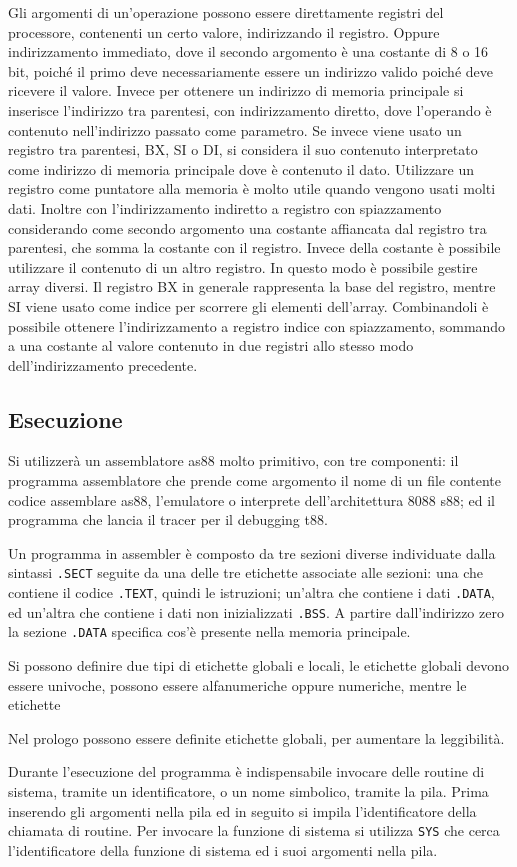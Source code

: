 \documentclass{article}
\numberwithin{equation}{subsection}
\begin{document}
Gli argomenti di un'operazione possono essere direttamente registri del processore, contenenti un certo valore, indirizzando il registro. Oppure indirizzamento immediato, 
dove il secondo argomento è una costante di 8 o 16 bit, poiché il primo deve necessariamente essere un indirizzo valido poiché deve ricevere il valore. Invece per ottenere 
un indirizzo di memoria principale si inserisce l'indirizzo tra parentesi, con indirizzamento diretto, dove l'operando è contenuto nell'indirizzo passato come parametro. 
Se invece viene usato un registro tra parentesi, BX, SI o DI, si considera il suo contenuto interpretato come indirizzo di memoria principale dove è contenuto il dato. 
Utilizzare un registro come puntatore alla memoria è molto utile quando vengono usati molti dati.  
Inoltre con l'indirizzamento indiretto a registro con spiazzamento considerando come secondo argomento una costante affiancata dal registro tra parentesi, che somma la 
costante con il registro. Invece della costante è possibile utilizzare il contenuto di un altro registro. 
In questo modo è possibile gestire array diversi. Il registro BX in generale rappresenta la base del registro, mentre SI viene usato come indice per scorrere gli elementi 
dell'array. Combinandoli è possibile ottenere l'indirizzamento a registro indice con spiazzamento, sommando a una costante al valore contenuto in due registri allo stesso 
modo dell'indirizzamento precedente. 


\subsection{Esecuzione}

Si utilizzerà un assemblatore as88 molto primitivo, con tre componenti: il programma assemblatore che prende come argomento il nome di un file contente codice assemblare as88, 
l'emulatore o interprete dell'architettura 8088 s88; ed il programma che lancia il tracer per il debugging t88. 


Un programma in assembler è composto da tre sezioni diverse individuate dalla sintassi \verb|.SECT| seguite da una delle tre etichette associate alle sezioni: una che contiene 
il codice \verb|.TEXT|, quindi le istruzioni; un'altra che contiene i dati \verb|.DATA|, ed un'altra che contiene i dati non inizializzati \verb|.BSS|. 
A partire dall'indirizzo zero la sezione \verb|.DATA| specifica cos'è presente nella memoria principale. 

Si possono definire due tipi di etichette globali e locali, le etichette globali devono essere univoche, possono essere alfanumeriche oppure numeriche, mentre le 
etichette 

Nel prologo possono essere definite etichette globali, per aumentare la leggibilità. 


Durante l'esecuzione del programma è indispensabile invocare delle routine di sistema, tramite un identificatore, o un nome simbolico, tramite la pila. Prima inserendo gli 
argomenti nella pila ed in seguito si impila l'identificatore della chiamata di routine. Per invocare la funzione di sistema si utilizza \verb|SYS| che cerca l'identificatore 
della funzione di sistema ed i suoi argomenti nella pila. 
\end{document}

